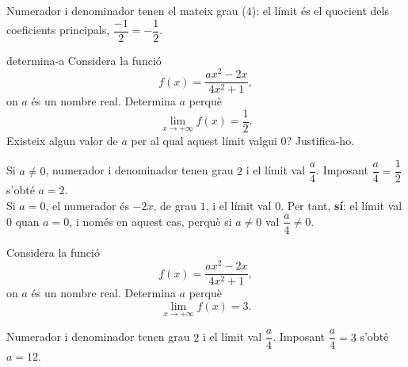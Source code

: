 \begin{apartats}
\begin{nomesllarg}
\begin{solucio}
Numerador i denominador tenen el mateix grau ($4$): el límit és el quocient dels coeficients
principals, $\dfrac{-1}{2}=-\dfrac12$.
\end{solucio}
\end{nomesllarg}

\begin{tria}{determina-a}
Considera la funció
\[
f(x)=\frac{ax^2-2x}{4x^2+1},
\]
on $a$ és un nombre real. Determina $a$ perquè
\[
\lim_{x\to+\infty}f(x)=\frac12 .
\]
Existeix algun valor de $a$ per al qual aquest límit valgui $0$? Justifica-ho.

\begin{solucio}
Si $a\neq0$, numerador i denominador tenen grau $2$ i el límit val $\dfrac{a}{4}$.
Imposant $\dfrac{a}{4}=\dfrac12$ s'obté $\boxed{a=2}$.\\
Si $a=0$, el numerador és $-2x$, de grau $1$, i el límit val $0$. Per tant, \textbf{sí}: el
límit val $0$ quan $a=0$, i només en aquest cas, perquè si $a\neq0$ val $\dfrac a4\neq0$.
\end{solucio}

Considera la funció
\[
f(x)=\frac{ax^2-2x}{4x^2+1},
\]
on $a$ és un nombre real. Determina $a$ perquè
\[
\lim_{x\to+\infty}f(x)=3 .
\]

\begin{solucio}
Numerador i denominador tenen grau $2$ i el límit val $\dfrac{a}{4}$.
Imposant $\dfrac{a}{4}=3$ s'obté $\boxed{a=12}$.
\end{solucio}
\end{tria}

\end{apartats}
